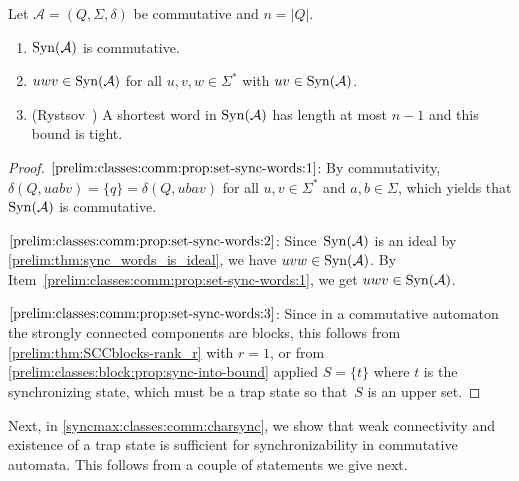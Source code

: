\begin{proposition} \label{prelim:classes:comm:prop:set-sync-words}
	Let $\mathcal A = (Q, \Sigma,\delta)$ be commutative and $n = |Q|$.
	\begin{enumerate}
		\item \label{prelim:classes:comm:prop:set-sync-words:1} $\operatorname{Syn}(\mathcal A)$ is commutative.
		
		\item \label{prelim:classes:comm:prop:set-sync-words:2} $uwv \in \operatorname{Syn}(\mathcal A)$ for all $u,v,w \in \Sigma^*$ with $uv \in \operatorname{Syn}(\mathcal A)$.
		
		\item \label{prelim:classes:comm:prop:set-sync-words:3} (Rystsov~\cite{Rys96,Rystsov97}) A shortest word in $\operatorname{Syn}(\mathcal A)$ has length at most $n - 1$ and this bound is tight.		
	\end{enumerate}
\end{proposition}
\begin{proof}
	$\ref{prelim:classes:comm:prop:set-sync-words:1}$: By commutativity, $\delta(Q, uabv) = \{q\} = \delta(Q, ubav)$
	for all $u,v \in \Sigma^*$ and $a,b \in \Sigma$,
	which yields that $\operatorname{Syn}(\mathcal A)$ is commutative.
	
	$\ref{prelim:classes:comm:prop:set-sync-words:2}$: Since~$\operatorname{Syn}(\mathcal A)$ is an ideal by \cref{prelim:thm:sync_words_is_ideal},
	we have $uvw \in \operatorname{Syn}(\mathcal A)$. By Item~\ref{prelim:classes:comm:prop:set-sync-words:1},
	we get $uwv \in \operatorname{Syn}(\mathcal A)$.
	
	$\ref{prelim:classes:comm:prop:set-sync-words:3}$: Since in a commutative automaton
	the strongly connected components are blocks,
	this follows from \cref{prelim:thm:SCCblocks-rank_r} with $r = 1$,
	or from  \cref{prelim:classes:block:prop:sync-into-bound} applied $S = \{t\}$
	where $t$ is the synchronizing state, which must be a trap state
	so that~$S$ is an upper set.
\end{proof}

Next, in \cref{syncmax:classes:comm:charsync}, 
we show that weak connectivity and existence of a trap state is sufficient
for synchronizability in commutative automata. This follows from a couple of statements
we give next.

